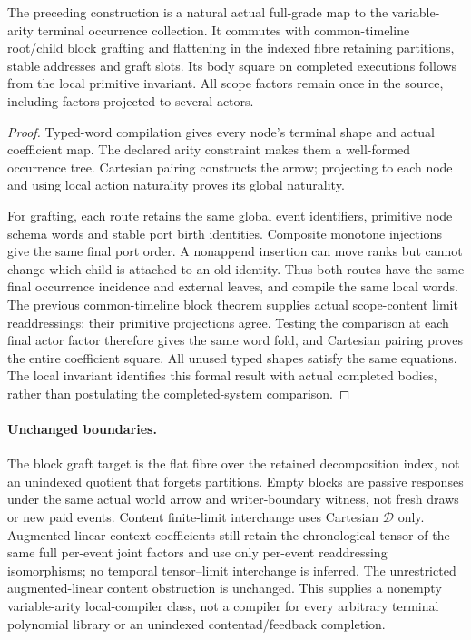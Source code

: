 \documentclass[11pt]{article}
\begin{document}
\begin{theorem}
The preceding construction is a natural actual full-grade map to the variable-arity terminal occurrence collection. It commutes with common-timeline root/child block grafting and flattening in the indexed fibre retaining partitions, stable addresses and graft slots. Its body square on completed executions follows from the local primitive invariant. All scope factors remain once in the source, including factors projected to several actors.
\end{theorem}
\begin{proof}
Typed-word compilation gives every node's terminal shape and actual coefficient map. The declared arity constraint makes them a well-formed occurrence tree. Cartesian pairing constructs the arrow; projecting to each node and using local action naturality proves its global naturality.

For grafting, each route retains the same global event identifiers, primitive node schema words and stable port birth identities. Composite monotone injections give the same final port order. A nonappend insertion can move ranks but cannot change which child is attached to an old identity. Thus both routes have the same final occurrence incidence and external leaves, and compile the same local words. The previous common-timeline block theorem supplies actual scope-content limit readdressings; their primitive projections agree. Testing the comparison at each final actor factor therefore gives the same word fold, and Cartesian pairing proves the entire coefficient square. All unused typed shapes satisfy the same equations. The local invariant identifies this formal result with actual completed bodies, rather than postulating the completed-system comparison.
\end{proof}

\paragraph{Unchanged boundaries.} The block graft target is the flat fibre over the retained decomposition index, not an unindexed quotient that forgets partitions. Empty blocks are passive responses under the same actual world arrow and writer-boundary witness, not fresh draws or new paid events. Content finite-limit interchange uses Cartesian $\mathcal D$ only. Augmented-linear context coefficients still retain the chronological tensor of the same full per-event joint factors and use only per-event readdressing isomorphisms; no temporal tensor--limit interchange is inferred. The unrestricted augmented-linear content obstruction is unchanged. This supplies a nonempty variable-arity local-compiler class, not a compiler for every arbitrary terminal polynomial library or an unindexed contentad/feedback completion.
\end{document}
